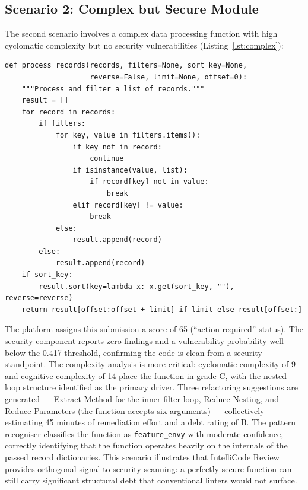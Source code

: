 \documentclass[12pt, oneside]{report}
\begin{document}
\subsection{Scenario 2: Complex but Secure Module}

The second scenario involves a complex data processing function with high cyclomatic
complexity but no security vulnerabilities (Listing~\ref{lst:complex}):

\begin{lstlisting}[caption={Complex but secure code snippet},
                   label={lst:complex}, style=pythonstyle]
def process_records(records, filters=None, sort_key=None,
                    reverse=False, limit=None, offset=0):
    """Process and filter a list of records."""
    result = []
    for record in records:
        if filters:
            for key, value in filters.items():
                if key not in record:
                    continue
                if isinstance(value, list):
                    if record[key] not in value:
                        break
                elif record[key] != value:
                    break
            else:
                result.append(record)
        else:
            result.append(record)
    if sort_key:
        result.sort(key=lambda x: x.get(sort_key, ""), reverse=reverse)
    return result[offset:offset + limit] if limit else result[offset:]
\end{lstlisting}

The platform assigns this submission a score of 65 (``action required'' status). The
security component reports zero findings and a vulnerability probability well below
the 0.417 threshold, confirming the code is clean from a security standpoint. The
complexity analysis is more critical: cyclomatic complexity of 9 and cognitive
complexity of 14 place the function in grade C, with the nested loop structure
identified as the primary driver. Three refactoring suggestions are generated ---
Extract Method for the inner filter loop, Reduce Nesting, and Reduce Parameters
(the function accepts six arguments) --- collectively estimating 45 minutes of
remediation effort and a debt rating of B. The pattern recogniser classifies the
function as \texttt{feature\_envy} with moderate confidence, correctly identifying
that the function operates heavily on the internals of the passed record dictionaries.
This scenario illustrates that IntelliCode Review provides orthogonal signal to
security scanning: a perfectly secure function can still carry significant structural
debt that conventional linters would not surface.
\end{document}
